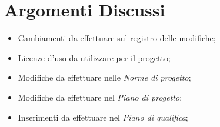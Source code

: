 \section{Argomenti Discussi}
	\begin{itemize}
		\item Cambiamenti da effettuare sul registro delle modifiche;%
		\item Licenze d'uso da utilizzare per il progetto;
		\item Modifiche da effettuare nelle \textit{Norme di progetto}\docs; 
		\item Modifiche da effettuare nel \textit{Piano di progetto}\docs; 
		\item Inserimenti da effettuare nel \textit{Piano di qualifica}\doc;%
	\end{itemize}